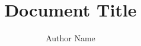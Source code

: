 \documentclass[ %
  english,                  %
  a4paper,
  oneside,
  12pt,
  headsepline,
  listof=totoc,
  bibliography=totoc,
]{FhKtnThesis}
\title{Document Title}
\author{Author Name}
\begin{document}
  \maketitle                          %
  \makestatement	                      %
  \tableofcontents                    %

  \listoffigures                      %
  \listoftables                       %
  

  
  
  
  
\end{document}

